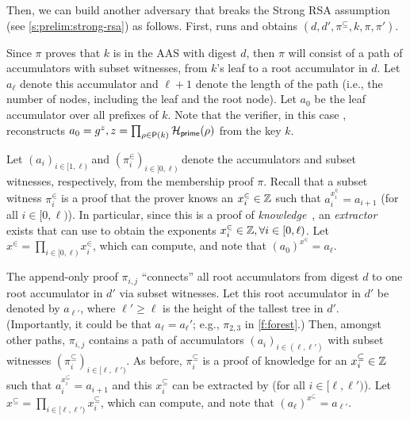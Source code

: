 Then, we can build another adversary \AdvB that breaks the Strong RSA assumption (see \cref{s:prelim:strong-rsa}) as follows.
First, \AdvB runs \Adv and obtains $(d,d',\pi^\subseteq,k,\pi,\pi')$.

Since $\pi$ proves that $k$ is in the AAS with digest $d$, then $\pi$ will consist of a path of accumulators with subset witnesses, from $k$'s leaf to a root accumulator in $d$.
Let $a_\ell$ denote this accumulator and $\ell+1$ denote the length of the path (i.e., the number of nodes, including the leaf and the root node).
Let $a_0$ be the leaf accumulator over all prefixes of $k$.
Note that the verifier, in this case \AdvB, reconstructs $a_0=g^z, z = \prod_{\rho\in\mathsf{P}(k)} \mathcal{H}_{\mathsf{prime}}(\rho)$ from the key $k$.

Let $(a_i)_{i\in[1,\ell)}$ and $(\pi_i^\in)_{i\in[0,\ell)}$ denote the accumulators and subset witnesses, respectively, from the membership proof $\pi$.
Recall that a subset witness $\pi_i^\in$ is a \poketwo proof that the prover knows an $x_i^\in \in \mathbb{Z}$ such that $a_{i}^{x_i^\in} = a_{i+1}$ (for all $i\in[0,\ell)$).
In particular, since this is a proof of \textit{knowledge}~\cite{GMR85}, an \textit{extractor} exists that \AdvB can use to obtain the exponents $x_i^\in \in \mathbb{Z},\forall i\in[0,\ell)$.
Let $x^\in = \prod_{i \in [0,\ell)} x_i^\in$, which \AdvB can compute, and note that $\left(a_0\right)^{x^\in} = a_\ell$.

The append-only proof $\pi_{i,j}$ ``connects'' all root accumulators from digest $d$ to one root accumulator in $d'$ via subset witnesses.
Let this root accumulator in $d'$ be denoted by $a_{\ell'}$, where $\ell' \ge \ell$ is the height of the tallest tree in $d'$.
(Importantly, it could be that $a_\ell = a_\ell'$; e.g., $\pi_{2,3}$ in \cref{f:forest}.)
Then, amongst other paths, $\pi_{i,j}$ contains a path of accumulators $(a_i)_{i\in(\ell,\ell')}$ with subset witnesses $(\pi_i^\subseteq)_{i\in[\ell,\ell')}$.
As before, $\pi_i^\subseteq$ is a \poketwo proof of knowledge for an $x_i^\subseteq \in \mathbb{Z}$ such that $a_{i}^{x_i^\subseteq} = a_{i+1}$ and this $x_i^\subseteq$ can be extracted by \AdvB (for all $i\in[\ell,\ell')$).
Let $x^\subseteq = \prod_{i \in [\ell,\ell')} x_i^\subseteq$, which \AdvB can compute, and note that $\left(a_\ell\right)^{x^\subseteq} = a_{\ell'}$.
 
